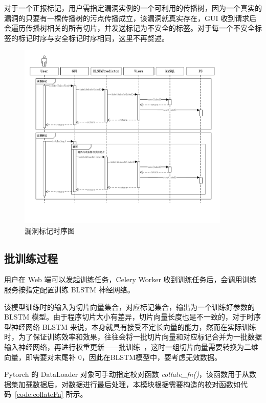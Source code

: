 对于一个正报标记，用户需指定漏洞实例的一个可利用的传播树，因为一个真实的漏洞的只要有一棵传播树的污点传播成立，该漏洞就真实存在，GUI 收到请求后会遍历传播树相关的所有切片，并发送标记为不安全的标签。对于每一个不安全标签的标记时序与安全标记时序相同，这里不再赘述。


\begin{figure}[htbp]
    \centering
    \includegraphics[width=0.9\textwidth]{FIGs/chapter4/labelTime.pdf}
    \caption{漏洞标记时序图}\label{labelTime}
\end{figure}

\subsection{批训练过程}

用户在 Web 端可以发起训练任务，Celery Worker 收到训练任务后，会调用训练服务按指定配置训练 BLSTM 神经网络。

该模型训练时的输入为切片向量集合，对应标记集合，输出为一个训练好参数的 BLSTM 模型。由于程序切片大小有差异，切片向量长度也是不一致的，对于时序型神经网络 BLSTM 来说，本身就具有接受不定长向量的能力，然而在实际训练时，为了保证训练效率和效果，往往会将一批切片向量和对应标记合并为一批数据输入神经网络，再进行权重更新——批训练~\cite{imageNet,trainLonger,largeBatchLSTM}，这时一组切片向量需要转换为二维向量，即需要对末尾补 0，因此在BLSTM模型中，要考虑无效数据。

Pytorch 的 DataLoader 对象可手动指定校对函数 \textit{collate\_fn()}，该函数用于从数据集加载数据后，对数据进行最后处理，本模块根据需要构造的校对函数如代码~\ref{code:collateFn} 所示。

